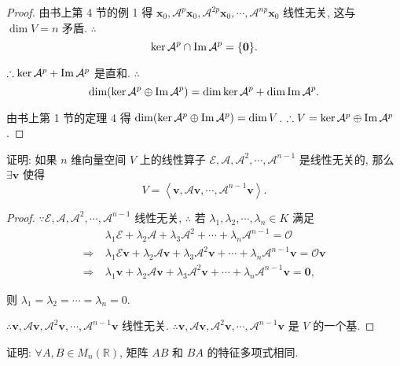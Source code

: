 \documentclass[color=black,device=normal,lang=cn,mode=geye]{elegantnote}
\begin{document}
\begin{proof}
    由书上第 4 节的例 1 得 $\boldsymbol{x}_0,\mathcal{A}^p\boldsymbol{x}_0,\mathcal{A}^{2p}\boldsymbol{x}_0,\cdots,\mathcal{A}^{np}\boldsymbol{x}_0$ 线性无关, 这与 $\dim V=n$ 矛盾. $\therefore$
    \[\ker\mathcal{A}^p\cap\operatorname{Im} \mathcal{A}^p=\{\boldsymbol{0}\}.\]

    $\therefore\ker\mathcal{A}^p+\operatorname{Im} \mathcal{A}^p$ 是直和. $\therefore$
    \[\dim(\ker\mathcal{A}^p\oplus\operatorname{Im} \mathcal{A}^p)=\dim\ker\mathcal{A}^p+\dim\operatorname{Im} \mathcal{A}^p.\]

    由书上第 1 节的定理 4 得 $\dim(\ker\mathcal{A}^p\oplus\operatorname{Im} \mathcal{A}^p)=\dim V$. $\therefore V=\ker\mathcal{A}^p\oplus\operatorname{Im} \mathcal{A}^p$.
\end{proof}
\begin{exercise}%
    证明: 如果 $n$ 维向量空间 $V$ 上的线性算子 $\mathcal{E},\mathcal{A},\mathcal{A}^2,\cdots,\mathcal{A}^{n-1}$ 是线性无关的, 那么 $\exists\boldsymbol{v}$ 使得
    \[V=\left<\boldsymbol{v},\mathcal{A}\boldsymbol{v},\cdots,\mathcal{A}^{n-1}\boldsymbol{v}\right>.\]
\end{exercise}
\begin{proof}
    $\because\mathcal{E},\mathcal{A},\mathcal{A}^2,\cdots,\mathcal{A}^{n-1}$ 线性无关, $\therefore$ 若 $\lambda_1,\lambda_2,\cdots,\lambda_n\in K$ 满足
    \begin{align*}
        & \lambda_1\mathcal{E}+\lambda_2\mathcal{A}+\lambda_3\mathcal{A}^2+\cdots+\lambda_n\mathcal{A}^{n-1}=\mathcal{O} \\
        \Rightarrow\ & \lambda_1\mathcal{E}\boldsymbol{v}+\lambda_2\mathcal{A}\boldsymbol{v}+\lambda_3\mathcal{A}^2\boldsymbol{v}+\cdots+\lambda_n\mathcal{A}^{n-1}\boldsymbol{v}=\mathcal{O}\boldsymbol{v} \\
        \Rightarrow\ & \lambda_1\boldsymbol{v}+\lambda_2\mathcal{A}\boldsymbol{v}+\lambda_3\mathcal{A}^2\boldsymbol{v}+\cdots+\lambda_n\mathcal{A}^{n-1}\boldsymbol{v}=\boldsymbol{0},
    \end{align*}

    则 $\lambda_1=\lambda_2=\cdots=\lambda_n=0$.

    $\therefore\boldsymbol{v},\mathcal{A}\boldsymbol{v},\mathcal{A}^2\boldsymbol{v},\cdots,\mathcal{A}^{n-1}\boldsymbol{v}$ 线性无关. $\therefore\boldsymbol{v},\mathcal{A}\boldsymbol{v},\mathcal{A}^2\boldsymbol{v},\cdots,\mathcal{A}^{n-1}\boldsymbol{v}$ 是 $V$ 的一个基.
\end{proof}
\begin{exercise}%
    证明: $\forall A,B\in M_n(\mathbb{R})$, 矩阵 $AB$ 和 $BA$ 的特征多项式相同.
\end{exercise}
\end{document}
